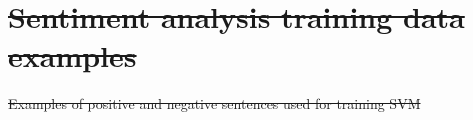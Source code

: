 \documentclass[smallextended,natbib]{svjour3}       %
\providecommand{\DIFdel}[1]{{\protect\color{red}\sout{#1}}}                      %
\providecommand{\DIFdelFL}[1]{\DIFdel{#1}} %
\begin{document}

\section{\DIFdel{Sentiment analysis training data examples}}%
\addtocounter{section}{-1}%

{%
\DIFdelFL{Examples of positive and negative sentences used for training SVM}}
\end{document}
